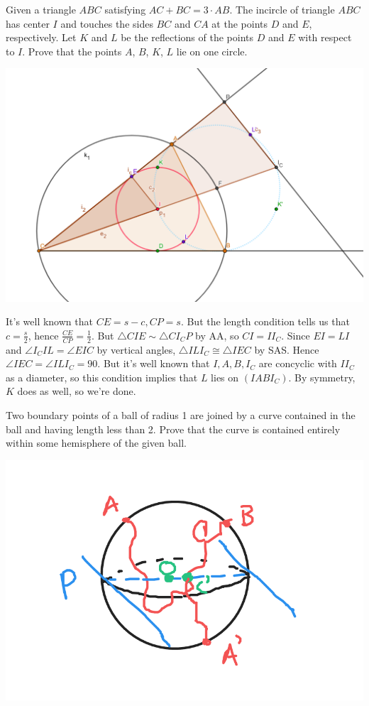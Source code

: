 \documentclass[11pt]{scrartcl}
\begin{document}
\begin{example}
  [ISL 2005]
  Given a triangle $ABC$ satisfying $AC+BC=3\cdot AB$. The incircle of triangle $ABC$ has center $I$ and touches the sides $BC$ and $CA$ at the points $D$ and $E$, respectively. Let $K$ and $L$ be the reflections of the points $D$ and $E$ with respect to $I$. Prove that the points $A$, $B$, $K$, $L$ lie on one circle.
\end{example}
\begin{soln}
  \begin{center}\includegraphics[scale=0.3]{image.png}\end{center}
    It's well known that $CE=s-c, CP=s$. But the length condition tells us that $c=\frac{s}{2}$, hence $\frac{CE}{CP}=\frac{1}{2}$. But $\triangle CIE\sim\triangle CI_CP$ by AA, so $CI=II_C$. Since $EI=LI$ and $\angle I_CIL=\angle EIC$ by vertical angles, $\triangle ILI_C\cong \triangle IEC$ by SAS. Hence $\angle IEC=\angle ILI_C=90$. But it's well known that $I,A,B,I_C$ are concyclic with $II_C$ as a diameter, so this condition implies that $L$ lies on $(IABI_C)$. By symmetry, $K$ does as well, so we're done.
\end{soln}
\begin{example}
  [USAMO 1974 P3]
  Two boundary points of a ball of radius 1 are joined by a curve contained in the ball and having length less than 2. Prove that the curve is contained entirely within some hemisphere of the given ball.
\end{example}
\begin{center}\includegraphics[scale=0.3]{USAMO1974P3.png}\end{center}
\end{document}
